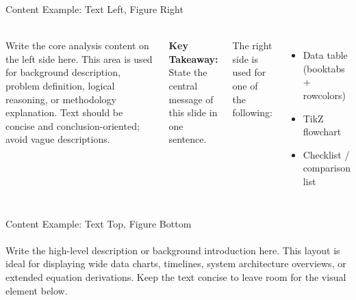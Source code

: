 \documentclass[aspectratio=169,10pt,xcolor=table]{beamer}
\begin{document}
\begin{frame}{Content Example: Text Left, Figure Right}
\framesubtitle{} %
\small
\begin{columns}[T]
Write the core analysis content on the left side here.
This area is used for background description, problem definition,
logical reasoning, or methodology explanation.
Text should be concise and conclusion-oriented; avoid vague descriptions.

\vspace{0.6em}
\textbf{Key Takeaway:}
State the central message of this slide in one sentence.

The right side is used for one of the following:
\begin{itemize}
\item Data table (booktabs + rowcolors)
\item TikZ flowchart
\item Checklist / comparison list
\end{itemize}
\end{columns}
\end{frame}

\begin{frame}{Content Example: Text Top, Figure Bottom}
\framesubtitle{} %
\small

Write the high-level description or background introduction here.
This layout is ideal for displaying wide data charts, timelines,
system architecture overviews, or extended equation derivations.
Keep the text concise to leave room for the visual element below.

\vspace{1em}

\centering

\vspace{0.5em}
\end{frame}
\end{document}
